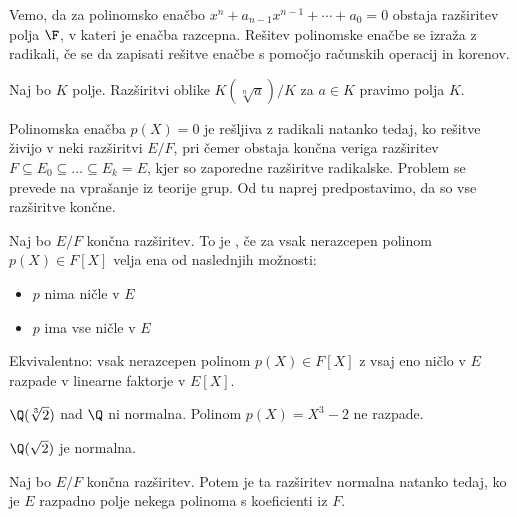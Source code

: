 
Vemo, da za polinomsko enačbo $x^n + a_{n-1} x^{n-1} + \cdots + a_0 = 0$ obstaja
razširitev polja $\F$, v kateri je enačba razcepna.
Rešitev polinomske enačbe se izraža z radikali, če se da zapisati rešitve enačbe
s pomočjo računskih operacij in korenov.

\begin{definicija}
  Naj bo $K$ polje.
  Razširitvi oblike $K(\sqrt[n]{a})/K$ za $a \in K$ pravimo  polja $K$.
\end{definicija}

Polinomska enačba $p(X) = 0$ je rešljiva z radikali natanko tedaj, ko rešitve
živijo v neki razširitvi $E/F$, pri čemer obstaja končna veriga razširitev $F
\subseteq E_0 \subseteq \ldots \subseteq E_k = E$, kjer so zaporedne razširitve
radikalske.
Problem se prevede na vprašanje iz teorije grup.
Od tu naprej predpostavimo, da so vse razširitve končne.

\begin{definicija}
  Naj bo $E/F$ končna razširitev.
  To je , če za vsak nerazcepen polinom $p(X) \in
  F[X]$ velja ena od naslednjih možnosti:
  \begin{itemize}
  \item $p$ nima ničle v $E$
  \item $p$ ima vse ničle v $E$
  \end{itemize}
  Ekvivalentno: vsak nerazcepen polinom $p(X) \in F[X]$ z vsaj eno ničlo v $E$
  razpade v linearne faktorje v $E[X]$.
\end{definicija}

\begin{primer}
  $\Q(\sqrt[3]{2})$ nad $\Q$ ni normalna.
  Polinom $p(X) = X^3 - 2$ ne razpade.
\end{primer}

\begin{primer}
  $\Q(\sqrt{2})$ je normalna.
\end{primer}


\begin{izrek}
  Naj bo $E/F$ končna razširitev.
  Potem je ta razširitev normalna natanko tedaj, ko je $E$ razpadno polje nekega
  polinoma s koeficienti iz $F$.
\end{izrek}

